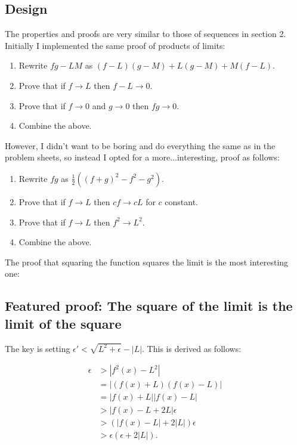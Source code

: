 \documentclass[a4paper, twoside, 11pt]{article}
\theoremstyle{definition}
\theoremstyle{plain}
\theoremstyle{remark}
\begin{document}
\subsection*{Design}

The properties and proofs are very similar to those of sequences in section 2. Initially I implemented the same proof of products of limits:
\begin{enumerate}
    \item Rewrite $fg - LM$ as $(f - L)(g - M) + L(g - M) + M(f - L)$.
    \item Prove that if $f \to L$ then $f - L \to 0$.
    \item Prove that if $f \to 0$ and $g \to 0$ then $fg \to 0$.
    \item Combine the above.
\end{enumerate}

However, I didn't want to be boring and do everything the same as in the problem sheets, so instead I opted for a more...interesting, proof as follows:
\begin{enumerate}
    \item Rewrite $fg$ as $\frac{1}{2}\left( \left( f + g \right)^{2} - f^{2} - g^{2} \right)$.
    \item Prove that if $f \to L$ then $cf \to cL$ for $c$ constant.
    \item Prove that if $f \to L$ then $f^{2} \to L^{2}$.
    \item Combine the above.
\end{enumerate}

The proof that squaring the function squares the limit is the most interesting one:

\subsection*{Featured proof: The square of the limit is the limit of the square}

The key is setting $\epsilon' < \sqrt{L^{2} + \epsilon} - \left\lvert L \right\rvert$. This is derived as follows:

\begin{align*}
    \epsilon
    &> \left\lvert f^{2}(x) - L^{2} \right\rvert \\
    &= \left\lvert (f(x) + L)(f(x) - L) \right\rvert \\
    &= \left\lvert f(x) + L \right\rvert \left\lvert f(x) - L \right\rvert \\
    &> \left\lvert f(x) - L + 2L \right\rvert \epsilon \\
    &> \left(\left\lvert f(x) - L \right\rvert + 2 \left\lvert L \right\rvert\right)\epsilon \\
    &> \epsilon\left( \epsilon + 2|L| \right)
.\end{align*}
\end{document}
